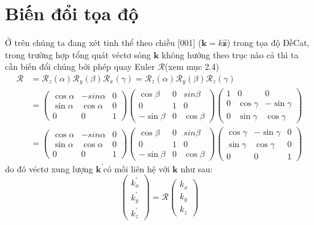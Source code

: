 \section{Biến đổi tọa độ}
Ở trên chúng ta đang xét tinh thể theo chiều [001] ($\mathbf{k}=k\mathbf{\hat{z}}$) trong tọa độ ĐềCat, trong trường hợp tổng quát véctơ sóng $\mathbf{k}$ không hướng theo trục nào cả thì ta cần biến đổi chúng bởi phép quay Euler $\mathcal{R}$(xem mục 2.4)
\begin{align*}
\mathcal{R}&= \mathcal{R}_z(\alpha)\mathcal{R}_y(\beta)\mathcal{R}_{\mathit{x}}(\gamma)
=\mathcal{R}_z(\alpha)\mathcal{R}_y(\beta)\mathcal{R}_z(\gamma)\\
&=\begin{pmatrix}
\cos\alpha &-sin\alpha & 0\\
\sin\alpha &\cos\alpha &0\\
0 &0 &1
\end{pmatrix}
\begin{pmatrix}
\cos\beta &0 &sin\beta\\
0 &1 & 0\\
-\sin\beta &0 &\cos\beta
\end{pmatrix}
\begin{pmatrix}
1 &0 &0 \\
0 &\cos\gamma &-\sin\gamma\\
0 &\sin\gamma &\cos\gamma
\end{pmatrix}\\
&=\begin{pmatrix}
\cos\alpha &-sin\alpha & 0\\
\sin\alpha &\cos\alpha &0\\
0 &0 &1
\end{pmatrix}
\begin{pmatrix}
\cos\beta &0 &sin\beta\\
0 &1 & 0\\
-\sin\beta &0 &\cos\beta
\end{pmatrix}
\begin{pmatrix}
\cos\gamma &-\sin\gamma &0\\
\sin\gamma &\cos\gamma &0\\
0 &0 &1
\end{pmatrix}
\end{align*} 
do đó véctơ xung lượng $\mathbf{k}^{'}$có mối liên hệ với $\mathbf{k}$ như sau:
\begin{equation}
\begin{pmatrix}
k_{\mathit{x}}^{'} \\k_y^{'} \\k_z^{'}\end{pmatrix}
 = \mathcal{R}\begin{pmatrix}
k_{\mathit{x}} \\k_y \\k_z
\end{pmatrix}
\end{equation}
